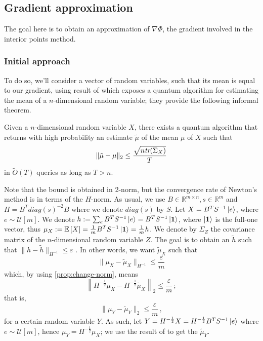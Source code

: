\subsection{Gradient approximation}
The goal here is to obtain an approximation of $\nabla \Phi$, the gradient
involved in the interior points method.

\subsubsection{Initial approach}\label{sec:initial-approach}

To do so, we'll consider a vector of random variables, such that its mean is
equal to our gradient, using result of \citeauthor{Cornelissen_2022} which
exposes a quantum algorithm for estimating the mean of a $n$-dimensional random
variable; they provide the following informal theorem.

\begin{theorem}\label{th:estimate-mean}
    Given a $n$-dimensional random variable $X$, there exists a quantum
    algorithm that returns with high probability an estimate $\tilde \mu$ of the
    mean $\mu$ of $X$ such that
\begin{equation*}
    \| \tilde \mu - \mu \|_2 \leq \frac{\sqrt{n \emph{tr}(\Sigma_X)}}{T}
\end{equation*}
in $\tilde O(T)$ queries as long as $T > n$.
\end{theorem}
Note that the bound is obtained in 2-norm, but the convergence rate of Newton's
method is in terms of the $H$-norm. As usual, we use $B \in \mathbb R^{m \times
n}, s \in \mathbb R^{m}$ and $H = B^T diag(s)^{-2} B$ where we denote $diag(s)$ by $S$. Let $X = B^T
S^{-1}\ket{e}$, where $e \sim \mathcal{U}[m]$. We denote $h := \sum_e B^T S^{-1}
\ket e = B^TS^{-1} \ket{\boldsymbol 1} $, where $\ket {\boldsymbol 1}$ is the full-one vector,
thus  $\mu_X := \mathbb E \left[ X \right] = \frac 1 m B^TS^{-1}\ket{\boldsymbol 1} = \frac 1 m h$. We
denote by $\Sigma_Z$ the covariance matrix of the $n$-dimensional random
variable $Z$. The goal is to obtain an $\tilde h$ such that $\|h - \tilde
h\|_{H^{-1}} \leq \varepsilon$ . In other words, we want $\tilde\mu_X$ such that
\begin{equation*}
    \|\mu_X - \tilde \mu_X \|_{H^{-1}} \leq \frac \varepsilon m
\end{equation*}
which, by using \autoref{prop:change-norm}, means
\begin{equation*}
    \left\|H^{-\frac 1 2} \mu_X - H^{-\frac 1 2}\tilde \mu_X \right\|_{2} \leq \frac \varepsilon m \, ;
\end{equation*}
that is,
\begin{equation} \label{eq:estimate-bound}
    \| \mu_Y -  \tilde \mu_Y \|_{2} \leq \frac \varepsilon m \, ,
\end{equation}
for a certain random variable $Y$.
As such, let $Y = H^{-\frac 1 2}X = H^{-\frac 1 2} B^T S^{-1}\ket{e}$ where $e
\sim \mathcal{U}[m]$, hence $\mu_Y = H^{-\frac 1 2} \mu_X$; we use the result of
\cite{Cornelissen_2022} to get the $\tilde \mu_Y$.


